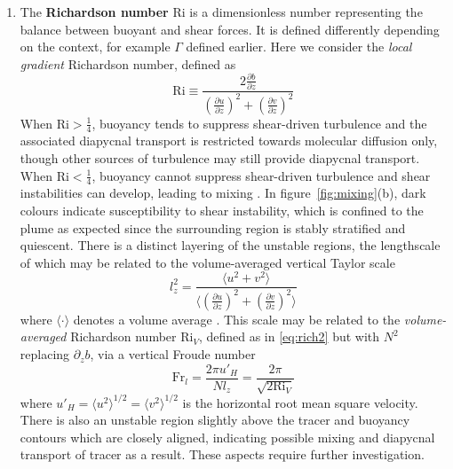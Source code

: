 \documentclass[a4paper]{article}
\begin{document}
\begin{enumerate}[label=(\alph*)]
	\item The \textbf{Richardson number} $\mathrm{Ri}$ is a dimensionless number representing the balance
		between buoyant and shear forces. It is defined differently depending on the context, for example
		$\Gamma$ defined earlier. Here we consider the \emph{local gradient} Richardson number, defined as
		\begin{equation}
			\mathrm{Ri} \equiv \frac{2\frac{\partial b}{\partial z}}{\left(\frac{\partial u}{\partial
			z}\right)^2 + \left(\frac{\partial v}{\partial z}\right)^2}
			\label{eq:rich2}
		\end{equation}
		When $\mathrm{Ri} > \frac{1}{4}$, buoyancy tends to suppress shear-driven turbulence and the
		associated diapycnal transport is restricted towards molecular diffusion only, though other sources of
		turbulence may still provide diapycnal transport. When $\mathrm{Ri} < \frac{1}{4}$, buoyancy cannot
		suppress shear-driven turbulence and shear instabilities can develop, leading to mixing
		\citep{ivey2008}. In figure~\ref{fig:mixing}(b), dark colours indicate susceptibility to shear
		instability, which is confined to the plume as expected since the surrounding region is stably
		stratified and quiescent. There is a distinct layering of the unstable regions, the lengthscale of
		which may be related to the volume-averaged vertical Taylor scale
		\begin{equation}
			l_z^2 = \frac{\langle u^2 + v^2 \rangle}{\langle \left(\frac{\partial u}{\partial z}\right)^2 +
		\left(\frac{\partial v}{\partial z}\right)^2 \rangle}
		\end{equation}
		where $\langle \cdot \rangle$ denotes a volume average \citep{riley2003}. This scale may be related to
		the \emph{volume-averaged} Richardson number $\mathrm{Ri}_V$, defined as in \eqref{eq:rich2} but with
		$N^2$ replacing $\partial_z b$, via a vertical Froude number
		\begin{equation}
			\mathrm{Fr}_l = \frac{2\pi u'_H}{N l_z} = \frac{2\pi}{\sqrt{2\mathrm{Ri}_V}}
		\end{equation}
		where $u'_H = \langle u^2 \rangle^{1/2} = \langle v^2 \rangle^{1/2}$ is the horizontal root mean
		square velocity. There is also an unstable region slightly above the tracer and buoyancy contours
		which are closely aligned, indicating possible mixing and diapycnal transport of tracer
		as a result. These aspects require further investigation.


\end{enumerate}
\end{document}
